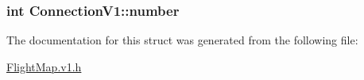 \subsubsection[{\texorpdfstring{number}{number}}]{\setlength{\rightskip}{0pt plus 5cm}int Connection\+V1\+::number}\hypertarget{struct_connection_v1_aae89534b17174667d7e92d5444dfceab}{}\label{struct_connection_v1_aae89534b17174667d7e92d5444dfceab}


The documentation for this struct was generated from the following file\+:\begin{DoxyCompactItemize}
\item 
\hyperlink{_flight_map_8v1_8h}{Flight\+Map.\+v1.\+h}\end{DoxyCompactItemize}
